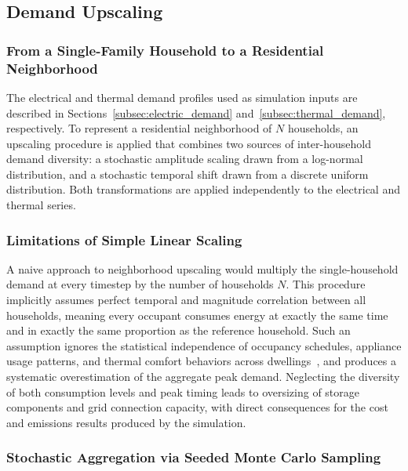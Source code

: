 \documentclass[12pt,a4paper]{report}
\begin{document}
\subsection{Demand Upscaling }
\label{subsec:demand_upscaling}
\subsubsection{From a Single-Family Household to a Residential Neighborhood}
The electrical and thermal demand profiles used as simulation inputs are
described in Sections~\ref{subsec:electric_demand}
and~\ref{subsec:thermal_demand}, respectively.
To represent a residential neighborhood of $N$ households, an upscaling
procedure is applied that combines two sources of inter-household demand
diversity: a stochastic amplitude scaling drawn from a log-normal
distribution, and a stochastic temporal shift drawn from a discrete uniform
distribution.
Both transformations are applied independently to the electrical and thermal
series.

\subsubsection{Limitations of Simple Linear Scaling}
\label{subsubsec:limitations_linear}

A naive approach to neighborhood upscaling would multiply the
single-household demand at every timestep by the number of households $N$.
This procedure implicitly assumes perfect temporal and magnitude correlation
between all households, meaning every occupant consumes energy at exactly the
same time and in exactly the same proportion as the reference household.
Such an assumption ignores the statistical independence of occupancy
schedules, appliance usage patterns, and thermal comfort behaviors across
dwellings~\cite{dickert2010coincidence}, and produces a systematic
overestimation of the aggregate peak demand.
Neglecting the diversity of both consumption levels and peak timing leads to
oversizing of storage components and grid connection capacity, with direct
consequences for the cost and emissions results produced by the simulation.

\subsubsection{Stochastic Aggregation via Seeded Monte Carlo Sampling}
\label{subsubsec:monte_carlo}
\end{document}

